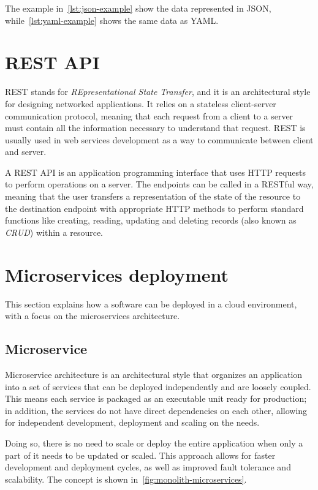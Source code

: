 The example in~\cref{lst:json-example} show the data represented in JSON, while~\cref{lst:yaml-example} shows the same data as YAML.

\section{REST API}

REST stands for \textit{REpresentational State Transfer}, and it is an architectural style for designing networked applications. It relies on a stateless client-server communication protocol, meaning that each request from a client to a server must contain all the information necessary to understand that request. REST is usually used in web services development as a way to communicate between client and server.

A REST API is an application programming interface that uses HTTP requests to perform operations on a server. The endpoints can be called in a RESTful way, meaning that the user transfers a representation of the state of the resource to the destination endpoint with appropriate HTTP methods to perform standard functions like creating, reading, updating and deleting records (also known as \textit{CRUD}) within a resource.~\cite{rest-api}

\section{Microservices deployment}

This section explains how a software can be deployed in a cloud environment, with a focus on the microservices architecture.

\subsection{Microservice}

Microservice architecture is an architectural style that organizes an application into a set of services that can be deployed independently and are loosely coupled. This means each service is packaged as an executable unit ready for production; in addition, the services do not have direct dependencies on each other, allowing for independent development, deployment and scaling on the needs.~\cite{microservices-what-are}

Doing so, there is no need to scale or deploy the entire application when only a part of it needs to be updated or scaled. This approach allows for faster development and deployment cycles, as well as improved fault tolerance and scalability. The concept is shown in~\cref{fig:monolith-microservices}.

